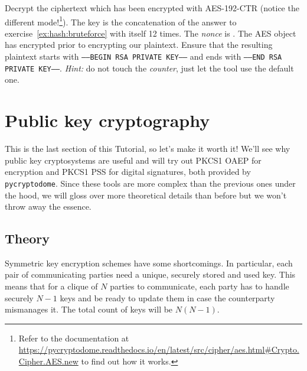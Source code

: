 \documentclass[a4paper,11pt]{article}
\begin{document}

    \begin{exercise*}
      \label{ex:aes:counter}
      Decrypt the ciphertext \topythonbytes{\ctrciphertext} which has been
      encrypted with AES-192-CTR (notice the different mode!\footnote{Refer to
      the documentation at
      \url{https://pycryptodome.readthedocs.io/en/latest/src/cipher/aes.html#Crypto.Cipher.AES.new}
      to find out how it works.}). The key is the concatenation of the answer to
      exercise~\ref{ex:hash:bruteforce} with itself 12 times. The \emph{nonce}
      is \texttt{\ctrnonce}. The AES object has encrypted
       prior to encrypting our plaintext. Ensure that
      the resulting plaintext starts with \texttt{-----BEGIN RSA PRIVATE
      KEY-----} and ends with \texttt{-----END RSA PRIVATE KEY-----}.
      \textit{Hint:} do not touch the \textit{counter}, just let the tool use
      the default one.
    \end{exercise*}


  \section{Public key cryptography}
    This is the last section of this Tutorial, so let's make it worth it! We'll
    see why public key cryptosystems are useful and will try out PKCS1 OAEP for
    encryption and PKCS1 PSS for digital signatures, both provided by
    \texttt{pycryptodome}. Since these tools are more complex than the previous
    ones under the hood, we will gloss over more theoretical details than before
    but we won't throw away the essence.

  \subsection{Theory}
    Symmetric key encryption schemes have some shortcomings. In particular,
    each pair of communicating parties need a unique, securely stored and used
    key. This means that for a clique of $N$ parties to communicate, each
    party has to handle securely $N-1$ keys and be ready to update them in
    case the counterparty mismanages it. The total count of keys will be
    $N(N-1)$.
\end{document}
